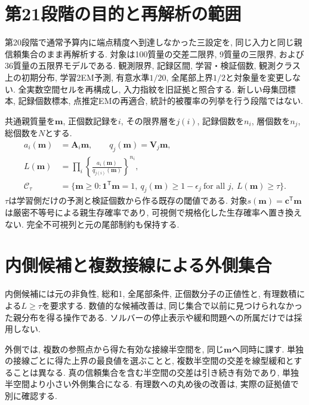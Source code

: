
\section{第21段階の目的と再解析の範囲}
\label{sec:stage21_scope}

第20段階で通常予算内に端点精度へ到達しなかった三設定を,
同じ入力と同じ親信頼集合のまま再解析する.
対象は100質量の交差二限界, 9質量の三限界,
および36質量の五限界モデルである.
観測限界, 記録区間, 学習・検証個数, 観測クラス上の初期分布,
学習2EM予測, 有意水準$1/20$, 全尾部上界$1/2$と対象量を変更しない.
全実数空間セルを再構成し, 入力指紋を旧証拠と照合する.
新しい母集団標本, 記録個数標本, 点推定EMの再適合,
統計的被覆率の列挙を行う段階ではない.

共通親質量を$\bm m$, 正個数記録を$i$, その限界層を$j(i)$,
記録個数を$n_i$, 層個数を$n_j$, 総個数を$N$とする.
\begin{align}
a_i(\bm m)&=\bm A_i\bm m,\qquad
q_j(\bm m)=\bm V_j\bm m,
\label{eq:stage21_probabilities}\\
L(\bm m)&=\prod_i
\left\{\frac{a_i(\bm m)}{q_{j(i)}(\bm m)}\right\}^{n_i},
\label{eq:stage21_likelihood}\\
\mathcal C_\tau
&=\{\bm m\ge0:\bm1^{\mathsf T}\bm m=1,
\ q_j(\bm m)\ge1-\epsilon_j\ \text{for all }j,
\ L(\bm m)\ge\tau\}.
\label{eq:stage21_confidence_set}
\end{align}
$\tau$は学習側だけの予測と検証個数から作る既存の閾値である.
対象$s(\bm m)=\bm c^{\mathsf T}\bm m$は厳密不等号による親生存確率であり,
可視側で規格化した生存確率へ置き換えない.
完全不可視列と元の尾部制約も保持する.

\section{内側候補と複数接線による外側集合}
\label{sec:stage21_multiple_planes}

内側候補には元の非負性, 総和1, 全尾部条件,
正個数分子の正値性と, 有理数積による$L\ge\tau$を要求する.
数値的な候補改善は, 同じ集合で以前に見つけられなかった親分布を得る操作である.
ソルバーの停止表示や緩和問題への所属だけでは採用しない.

外側では, 複数の参照点から得た有効な接線半空間を,
同じ$\bm m$へ同時に課す.
単独の接線ごとに得た上界の最良値を選ぶことと,
複数半空間の交差を線型緩和とすることは異なる.
真の信頼集合を含む半空間の交差は引き続き有効であり,
単独半空間より小さい外側集合になる.
有理数への丸め後の改善は, 実際の証拠値で別に確認する.

